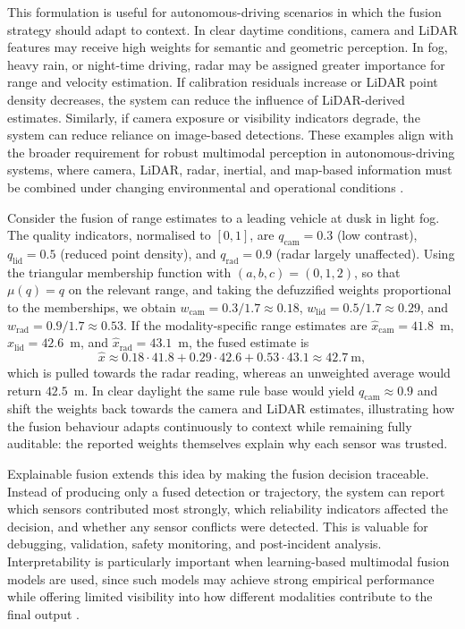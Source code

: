 This formulation is useful for autonomous-driving scenarios in which the fusion strategy should adapt to context. In clear daytime conditions, camera and LiDAR features may receive high weights for semantic and geometric perception. In fog, heavy rain, or night-time driving, radar may be assigned greater importance for range and velocity estimation. If calibration residuals increase or LiDAR point density decreases, the system can reduce the influence of LiDAR-derived estimates. Similarly, if camera exposure or visibility indicators degrade, the system can reduce reliance on image-based detections. These examples align with the broader requirement for robust multimodal perception in autonomous-driving systems, where camera, LiDAR, radar, inertial, and map-based information must be combined under changing environmental and operational conditions \cite{khaleghi_multisensor_2013, baltrusaitis_multimodal_2019}.


\begin{example}
Consider the fusion of range estimates to a leading vehicle at dusk in light fog. The quality indicators, normalised to $[0,1]$, are $q_{\mathrm{cam}}=0.3$ (low contrast), $q_{\mathrm{lid}}=0.5$ (reduced point density), and $q_{\mathrm{rad}}=0.9$ (radar largely unaffected). Using the triangular membership function with $(a,b,c)=(0,1,2)$, so that $\mu(q)=q$ on the relevant range, and taking the defuzzified weights proportional to the memberships, we obtain $w_{\mathrm{cam}}=0.3/1.7\approx0.18$, $w_{\mathrm{lid}}=0.5/1.7\approx0.29$, and $w_{\mathrm{rad}}=0.9/1.7\approx0.53$. If the modality-specific range estimates are $\hat{x}_{\mathrm{cam}}=41.8$~m, $\hat{x}_{\mathrm{lid}}=42.6$~m, and $\hat{x}_{\mathrm{rad}}=43.1$~m, the fused estimate is
\begin{equation*}
\hat{x} \approx 0.18\cdot41.8 + 0.29\cdot42.6 + 0.53\cdot43.1 \approx 42.7~\mathrm{m},
\end{equation*}
which is pulled towards the radar reading, whereas an unweighted average would return $42.5$~m. In clear daylight the same rule base would yield $q_{\mathrm{cam}}\approx0.9$ and shift the weights back towards the camera and LiDAR estimates, illustrating how the fusion behaviour adapts continuously to context while remaining fully auditable: the reported weights themselves explain why each sensor was trusted.
\end{example}


Explainable fusion extends this idea by making the fusion decision traceable. Instead of producing only a fused detection or trajectory, the system can report which sensors contributed most strongly, which reliability indicators affected the decision, and whether any sensor conflicts were detected. This is valuable for debugging, validation, safety monitoring, and post-incident analysis. Interpretability is particularly important when learning-based multimodal fusion models are used, since such models may achieve strong empirical performance while offering limited visibility into how different modalities contribute to the final output \cite{baltrusaitis_multimodal_2019}.

